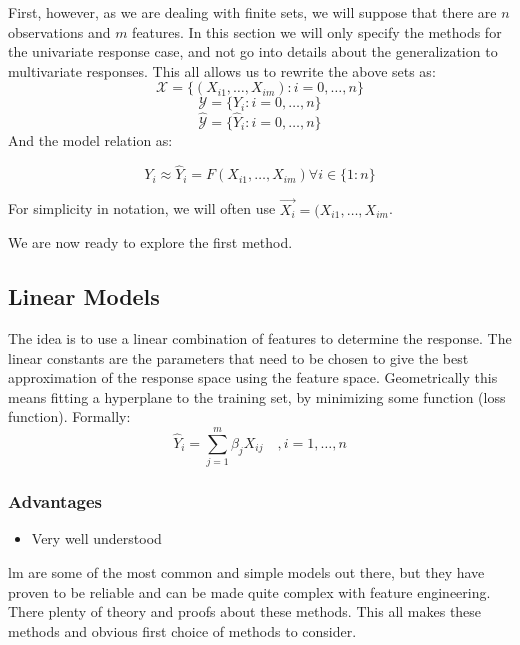 First, however, as we are dealing with finite sets, we will suppose that there are $n$ observations and $m$ features. In this section we will only specify the methods for the univariate response case, and not go into details about the generalization to multivariate responses. This all allows us to rewrite the above sets as:
$$\mathcal{X}=\{(X_{i1},\dots,X_{im}) : i=0,\dots,n\}$$
$$\mathcal{Y}=\{Y_i : i=0,\dots,n\}$$
$$\hat{\mathcal{Y}}=\{\hat{Y}_i : i=0,\dots,n\}$$
And the model relation as:

$$
Y_i \approx \hat{Y}_i = F(X_{i1},\dots,X_{im}) \forall i \in \{1:n\}
$$

For simplicity in notation, we will often use $ \vec{X_i}=(X_{i1},\dots,X_{im} $.

We are now ready to explore the first method.

\subsection{Linear Models}
The idea is to use a linear combination of features to determine the response. The linear constants are the parameters that need to be chosen to give the best approximation of the response space using the feature space. Geometrically this means fitting a hyperplane to the training set, by minimizing some function (loss function).
Formally:
$$
\hat{Y}_i = \sum_{j=1}^m \beta_{j} X_{ij} \quad, i=1,\dots,n
$$

\subsubsection{Advantages}
\begin{itemize}
\item Very well understood
\end{itemize}

\acrlong{lm} are some of the most common and simple models out there, but they have proven to be reliable and can be made quite complex with feature engineering. There plenty of theory and proofs about these methods. This all makes these methods and obvious first choice of methods to consider.
